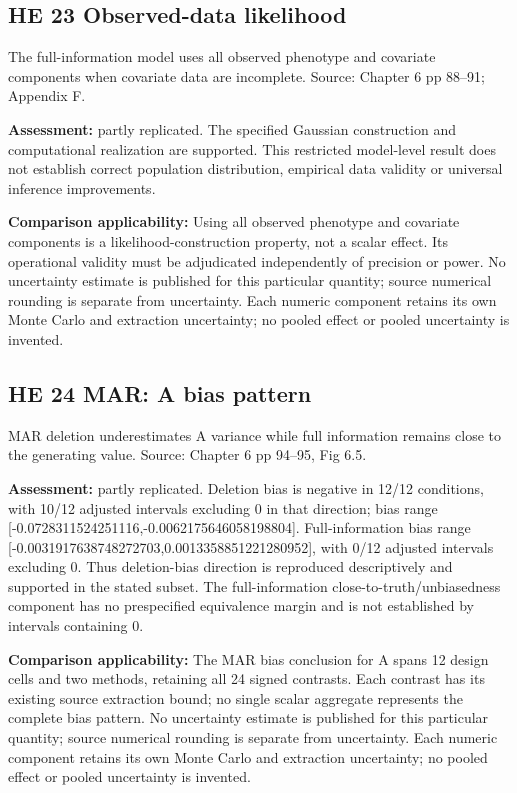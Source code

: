 \documentclass[11pt]{article}
\begin{document}
\subsection{HE 23 Observed-data likelihood}\label{head:HE23}
The full-information model uses all observed phenotype and covariate components when covariate data are incomplete. Source: Chapter 6 pp 88--91; Appendix F.

\textbf{Assessment:} partly replicated. The specified Gaussian construction and computational realization are supported. This restricted model-level result does not establish correct population distribution, empirical data validity or universal inference improvements.

\textbf{Comparison applicability:} Using all observed phenotype and covariate components is a likelihood-construction property, not a scalar effect. Its operational validity must be adjudicated independently of precision or power. No uncertainty estimate is published for this particular quantity; source numerical rounding is separate from uncertainty. Each numeric component retains its own Monte Carlo and extraction uncertainty; no pooled effect or pooled uncertainty is invented.
\subsection{HE 24 MAR: A bias pattern}\label{head:HE24}
MAR deletion underestimates A variance while full information remains close to the generating value. Source: Chapter 6 pp 94--95, Fig 6.5.

\textbf{Assessment:} partly replicated. Deletion bias is negative in 12/12 conditions, with 10/12 adjusted intervals excluding 0 in that direction; bias range [-0.0728311524251116,-0.0062175646058198804]. Full-information bias range [-0.0031917638748272703,0.0013358851221280952], with 0/12 adjusted intervals excluding 0. Thus deletion-bias direction is reproduced descriptively and supported in the stated subset. The full-information close-to-truth/unbiasedness component has no prespecified equivalence margin and is not established by intervals containing 0.

\textbf{Comparison applicability:} The MAR bias conclusion for A spans 12 design cells and two methods, retaining all 24 signed contrasts. Each contrast has its existing source extraction bound; no single scalar aggregate represents the complete bias pattern. No uncertainty estimate is published for this particular quantity; source numerical rounding is separate from uncertainty. Each numeric component retains its own Monte Carlo and extraction uncertainty; no pooled effect or pooled uncertainty is invented.
\end{document}
